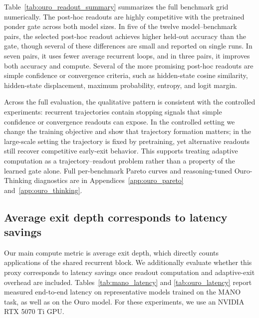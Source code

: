 \documentclass[10pt]{article} %
\begin{document}
Table~\ref{tab:ouro_readout_summary} summarizes the full benchmark grid numerically. The post-hoc readouts are highly competitive with the pretrained ponder gate across both model sizes. In five of the twelve model--benchmark pairs, the selected post-hoc readout achieves higher held-out accuracy than the gate, though several of these differences are small and reported on single runs. In seven pairs, it uses fewer average recurrent loops, and in three pairs, it improves both accuracy and compute. Several of the more promising post-hoc readouts are simple confidence or convergence criteria, such as hidden-state cosine similarity, hidden-state displacement, maximum probability, entropy, and logit margin.

Across the full evaluation, the qualitative pattern is consistent with the controlled experiments: recurrent trajectories contain stopping signals that simple confidence or convergence readouts can expose. In the controlled setting we change the training objective and show that trajectory formation matters; in the large-scale setting the trajectory is fixed by pretraining, yet alternative readouts still recover competitive early-exit behavior. This supports treating adaptive computation as a trajectory--readout problem rather than a property of the learned gate alone. Full per-benchmark Pareto curves and reasoning-tuned Ouro-Thinking diagnostics are in Appendices~\ref{app:ouro_pareto} and~\ref{app:ouro_thinking}.

\subsection{Average exit depth corresponds to latency savings}
\label{sec:latency}

Our main compute metric is average exit depth, which directly counts applications of the shared recurrent block. We additionally evaluate whether this proxy corresponds to latency savings once readout computation and adaptive-exit overhead are included. Tables~\ref{tab:mano_latency} and \ref{tab:ouro_latency} report measured end-to-end latency on representative models trained on the MANO task, as well as on the Ouro model. For these experiments, we use an NVIDIA RTX 5070 Ti GPU.
\end{document}
